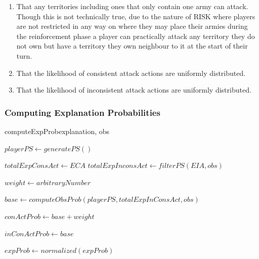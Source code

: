\documentclass[parskip]{cs4rep}
\begin{document}
\begin{enumerate}
\item
That any territories including ones that only contain one army can attack. Though this is not technically true, due to the nature of RISK where players are not restricted in any way on where they may place their armies during the reinforcement phase a player can practically attack any territory they do not own but have a territory they own neighbour to it at the start of their turn.
\item
That the likelihood of consistent attack actions are uniformly distributed.
\item
That the likelihood of inconsistent attack actions are uniformly distributed.
\end{enumerate}

\subsubsection{Computing Explanation Probabilities}

\begin{pseudocode}[ruled]{computeExpProb}{explanation, obs}
\begin{algorithm}[H]


$playerPS \gets generatePS()$

$totalExpConsAct \gets ECA$
$totalExpInconsAct \gets filterPS(EIA, obs)$

$weight \gets arbitraryNumber$ \newline

$base \gets computeObsProb(playerPS, totalExpInConsAct, obs)$ 

$conActProb \gets base + weight$

$inConActProb \gets base$ \newline


$expProb \gets normalized(expProb)$

\end{algorithm}
\end{pseudocode}
\end{document}
